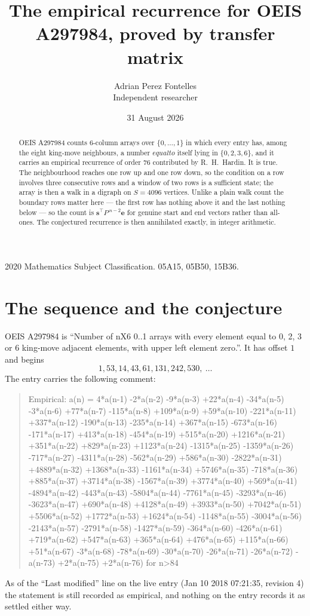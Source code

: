 \documentclass[11pt,a4paper]{article}
\title{The empirical recurrence for OEIS A297984, proved by transfer matrix}
\author{Adrian Perez Fontelles\\ \small Independent researcher}
\date{31 August 2026}
\theoremstyle{plain}
\theoremstyle{definition}
\begin{document}
\maketitle

\begin{abstract}
OEIS A297984 counts $6$-column arrays over $\{0,\dots,1\}$ in which every entry has,
among the eight king-move neighbours, a number $equal to$ itself lying in $\{0,2,3,6\}$, and it carries an empirical
recurrence of order $76$ contributed by R.~H.~Hardin. It is true. The neighbourhood
reaches one row up and one row down, so the condition on a row involves three consecutive
rows and a window of two rows is a sufficient state; the array is then a walk in a digraph
on $S=4096$ vertices. Unlike a plain walk count the boundary rows matter here --- the first
row has nothing above it and the last nothing below --- so the count is
$\mathbf{s}^{\!\top}P^{\,n-2}\mathbf{e}$ for genuine start and end vectors rather than
all-ones. The conjectured recurrence is then annihilated exactly, in integer arithmetic.
\end{abstract}

\noindent\small 2020 Mathematics Subject Classification. 05A15, 05B50, 15B36.\normalsize

\section{The sequence and the conjecture}

OEIS A297984 is ``Number of nX6 0..1 arrays with every element equal to 0, 2, 3 or 6 king-move adjacent elements, with upper left element zero.''. It has offset
$1$ and begins
\[
1, 53, 14, 43, 61, 131, 242, 530,\ \dots
\]
The entry carries the following comment:
\begin{quote}\small
Empirical: a(n) = 4*a(n-1) -2*a(n-2) -9*a(n-3) +22*a(n-4) -34*a(n-5) -3*a(n-6) +77*a(n-7) -115*a(n-8) +109*a(n-9) +59*a(n-10) -221*a(n-11) +337*a(n-12) -190*a(n-13) -235*a(n-14) +367*a(n-15) -673*a(n-16) -171*a(n-17) +413*a(n-18) -454*a(n-19) +515*a(n-20) +1216*a(n-21) +351*a(n-22) +829*a(n-23) +1123*a(n-24) -1315*a(n-25) -1359*a(n-26) -717*a(n-27) -4311*a(n-28) -562*a(n-29) +586*a(n-30) -2822*a(n-31) +4889*a(n-32) +1368*a(n-33) -1161*a(n-34) +5746*a(n-35) -718*a(n-36) +885*a(n-37) +3714*a(n-38) -1567*a(n-39) +3774*a(n-40) +569*a(n-41) -4894*a(n-42) -443*a(n-43) -5804*a(n-44) -7761*a(n-45) -3293*a(n-46) -3623*a(n-47) +690*a(n-48) +4128*a(n-49) +3933*a(n-50) +7042*a(n-51) +5506*a(n-52) +1772*a(n-53) +1624*a(n-54) -1148*a(n-55) -3004*a(n-56) -2143*a(n-57) -2791*a(n-58) -1427*a(n-59) -364*a(n-60) -426*a(n-61) +719*a(n-62) +547*a(n-63) +365*a(n-64) +476*a(n-65) +115*a(n-66) +51*a(n-67) -3*a(n-68) -78*a(n-69) -30*a(n-70) -26*a(n-71) -26*a(n-72) -a(n-73) +2*a(n-75) +2*a(n-76) for n>84
\end{quote}
As of the ``Last modified'' line on the live entry (Jan 10 2018 07:21:35, revision
4) the statement is still recorded as empirical, and nothing on the entry
records it as settled either way.
\end{document}
